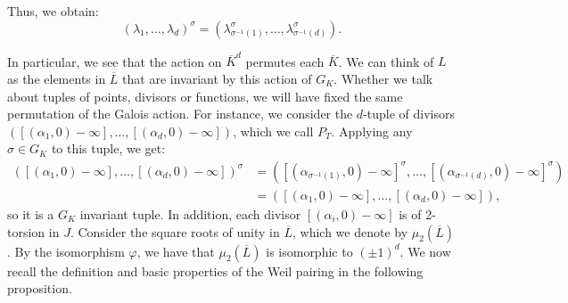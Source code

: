 \documentclass[a4paper, 12pt]{amsart}
\theoremstyle{definition}
\theoremstyle{plain}
\theoremstyle{plain}
\theoremstyle{plain}
\theoremstyle{plain}
\theoremstyle{remark}
\theoremstyle{remark}
\theoremstyle{plain}
\begin{document}
	Thus, we obtain:
	\begin{equation*}
		(\lambda_1,\ldots,\lambda_d)^\sigma=(\lambda_{\sigma^{-1}(1)}^\sigma,\ldots,\lambda_{\sigma^{-1}(d)}^\sigma).
	\end{equation*}
	
	In particular, we see that the action on $\overline{K}^d$ permutes each $\overline{K}$. We can think of $L$ as the elements in $\overline{L}$ that are invariant by this action of $G_K$. Whether we talk about tuples of points, divisors or functions, we will have fixed the same permutation of the Galois action. For instance, we consider the $d$-tuple of divisors $([(\alpha_1,0)-\infty],\ldots,[(\alpha_d,0)-\infty])$, which we call $P_T$. Applying any $\sigma\in G_K$ to this tuple, we get:
	\begin{align*}
		([(\alpha_1,0)-\infty],\ldots,[(\alpha_d,0)-\infty])^\sigma&=([(\alpha_{\sigma^{-1}(1)},0)-\infty]^\sigma,\ldots,[(\alpha_{\sigma^{-1}(d)},0)-\infty]^\sigma)\\
		&=([(\alpha_1,0)-\infty],\ldots,[(\alpha_d,0)-\infty]),
	\end{align*}
	so it is a $G_K$ invariant tuple. In addition, each divisor $[(\alpha_i,0)-\infty]$ is of 2-torsion in $J$. Consider the square roots of unity in $\overline{L}$, which we denote by $\mu_2(\overline{L})$. By the isomorphism $\varphi$, we have that $\mu_2(\overline{L})$ is isomorphic to $(\pm 1)^d$. We now recall the definition and basic properties of the Weil pairing in the following proposition.
\end{document}
